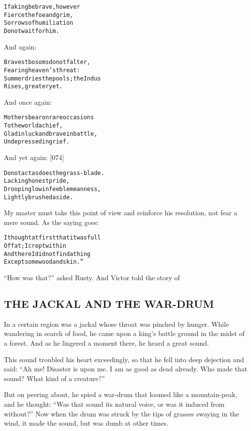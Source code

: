 \documentclass{article}
\renewenvironment{verbatim}{\begin{alltt}\normalfont\begin{centering}}{\end{centering}\end{alltt}}
\begin{document}
\begin{verbatim}
If a king be brave, however
    Fierce the foe and grim,
Sorrows of humiliation
    Do not wait for him.
\end{verbatim}
And again:

\begin{verbatim}
Bravest bosoms do not falter,
    Fearing heaven's threat:
Summer dries the pools; the Indus
    Rises, greater yet.
\end{verbatim}
And once again:

\begin{verbatim}
Mothers bear on rare occasions
    To the world a chief,
Glad in luck and brave in battle,
    Undepressed in grief.
\end{verbatim}
And yet again: [074]

\begin{verbatim}
Do not act as does the grass-blade.
    Lacking honest pride,
Drooping low in feeble meanness,
    Lightly brushed aside.
\end{verbatim}
My master must take this point of view and reinforce his
resolution, not fear a mere sound. As the saying goes:

\begin{verbatim}
I thought at first that it was full
    Of fat; I crept within
And there I did not find a thing
    Except some wood and skin.”
\end{verbatim}
``How was that?'' asked Rusty. And Victor told the story of

\subsection{THE JACKAL AND THE WAR-DRUM}

In a certain region was a jackal whose throat was pinched by
hunger. While wandering in search of food, he came upon a king's
battle ground in the midst of a forest. And as he lingered a moment
there, he heard a great sound.

This sound troubled his heart exceedingly, so that he fell into
deep dejection and said:
``Ah me! Disaster is upon me. I am as good as dead already. Who made that sound? What kind of a creature?''

But on peering about, he spied a war-drum that loomed like a
mountain-peak, and he thought:
``Was that sound its natural voice, or was it induced from without?''
Now when the drum was struck by the tips of grasses swaying in the
wind, it made the sound, but was dumb at other times.
\end{document}
